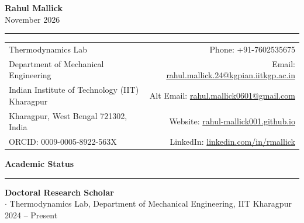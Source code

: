 \documentclass[10pt,letterpaper]{article}
\begin{document}
\begin{center}
    {\LARGE \textbf{Rahul Mallick}}\\[3pt]
    {\normalsize November 2026}
\end{center}

\vspace{-4pt}
\hrule
\vspace{5pt}

\noindent
\begin{tabular*}{\textwidth}{@{\extracolsep{\fill}}lr}
    Thermodynamics Lab & Phone: +91-7602535675 \\
    Department of Mechanical Engineering & Email: \href{mailto:rahul.mallick.24@kgpian.iitkgp.ac.in}{rahul.mallick.24@kgpian.iitkgp.ac.in} \\
    Indian Institute of Technology (IIT) Kharagpur & Alt Email: \href{mailto:rahul.mallick0601@gmail.com}{rahul.mallick0601@gmail.com} \\
    Kharagpur, West Bengal 721302, India & Website: \href{https://rahul-mallick001.github.io}{rahul-mallick001.github.io} \\
    ORCID: 0009-0005-8922-563X & LinkedIn: \href{https://www.linkedin.com/in/rmallick}{linkedin.com/in/rmallick}
\end{tabular*}

\medskip

\noindent\textbf{\large Academic Status}
\vspace{2pt}
\hrule
\vspace{4pt}
\noindent\textbf{Doctoral Research Scholar}\\
\hspace*{1em}$\cdot$ Thermodynamics Lab, Department of Mechanical Engineering, IIT Kharagpur \hfill 2024 -- Present

\medskip
\end{document}
